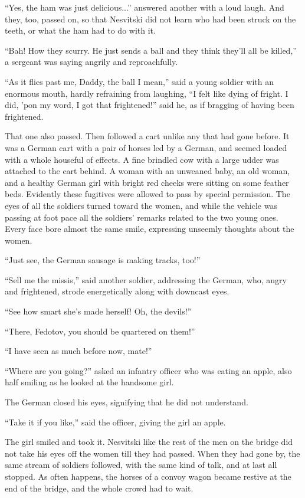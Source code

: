 ``Yes, the ham was just delicious...'' answered another with a
loud laugh.  And they, too, passed on, so that Nesvitski did not
learn who had been struck on the teeth, or what the ham had to do
with it.

``Bah! How they scurry. He just sends a ball and they think
they'll all be killed,'' a sergeant was saying angrily and
reproachfully.

``As it flies past me, Daddy, the ball I mean,'' said a young
soldier with an enormous mouth, hardly refraining from laughing,
``I felt like dying of fright. I did, 'pon my word, I got that
frightened!'' said he, as if bragging of having been frightened.

That one also passed. Then followed a cart unlike any that had
gone before. It was a German cart with a pair of horses led by a
German, and seemed loaded with a whole houseful of effects. A
fine brindled cow with a large udder was attached to the cart
behind. A woman with an unweaned baby, an old woman, and a
healthy German girl with bright red cheeks were sitting on some
feather beds. Evidently these fugitives were allowed to pass by
special permission. The eyes of all the soldiers turned toward
the women, and while the vehicle was passing at foot pace all the
soldiers' remarks related to the two young ones. Every face bore
almost the same smile, expressing unseemly thoughts about the
women.

``Just see, the German sausage is making tracks, too!''

``Sell me the missis,'' said another soldier, addressing the
German, who, angry and frightened, strode energetically along
with downcast eyes.

``See how smart she's made herself! Oh, the devils!''

``There, Fedotov, you should be quartered on them!''

``I have seen as much before now, mate!''

``Where are you going?'' asked an infantry officer who was eating
an apple, also half smiling as he looked at the handsome girl.

The German closed his eyes, signifying that he did not
understand.

``Take it if you like,'' said the officer, giving the girl an
apple.

The girl smiled and took it. Nesvitski like the rest of the men
on the bridge did not take his eyes off the women till they had
passed. When they had gone by, the same stream of soldiers
followed, with the same kind of talk, and at last all stopped. As
often happens, the horses of a convoy wagon became restive at the
end of the bridge, and the whole crowd had to wait.

